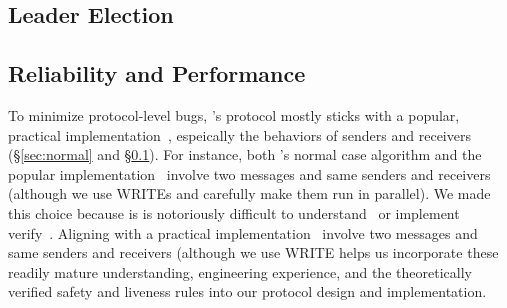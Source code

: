 





\subsection{Leader Election} \label{sec:election}



\subsection{Reliability and Performance} \label{sec:guarantees}

% 
To minimize protocol-level bugs, 
\xxx's \paxos protocol mostly sticks with a popular, 
practical implementation~\cite{paxos:practical}, espeically the behaviors of 
senders and receivers (\S\ref{sec:normal} and \S\ref{sec:election}). For 
instance, both \xxx's normal case algorithm and 
the popular implementation~\cite{paxos:practical} involve two messages and 
same senders and receivers (although we use WRITEs and carefully make them run 
in parallel). We made this choice 
because \paxos is \paxos is notoriously difficult to 
understand~\cite{raft:usenix14,paxos:simple,paxos,paxos:complex} or 
implement~\cite{paxos:live,paxos:practical} 
verify~\cite{modist:nsdi09,demeter:sosp11}. Aligning with a practical 
\paxos implementation~\cite{paxos:practical} involve two messages and 
same senders and receivers (although we use WRITE helps us incorporate these 
readily mature understanding, 
engineering experience, and the theoretically verified safety and liveness 
rules into our protocol design and implementation.


